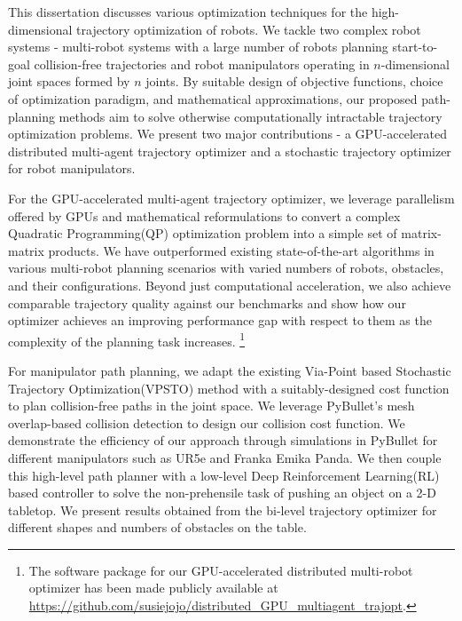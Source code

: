 This dissertation discusses various optimization techniques for the high-dimensional trajectory optimization of robots. We tackle two complex robot systems - multi-robot systems with a large number of robots planning start-to-goal collision-free trajectories and robot manipulators operating in $n$-dimensional joint spaces formed by $n$ joints. By suitable design of objective functions, choice of optimization paradigm, and mathematical approximations, our proposed path-planning methods aim to solve otherwise computationally intractable trajectory optimization problems. We present two major contributions - a GPU-accelerated distributed multi-agent trajectory optimizer and a stochastic trajectory optimizer for robot manipulators. 

For the GPU-accelerated multi-agent trajectory optimizer, we leverage parallelism offered by GPUs and mathematical reformulations to convert a complex Quadratic Programming(QP) optimization problem into a simple set of matrix-matrix products. We have outperformed existing state-of-the-art algorithms in various multi-robot planning scenarios with varied numbers of robots, obstacles, and their configurations. Beyond just computational acceleration, we also achieve comparable trajectory quality against our benchmarks and show how our optimizer achieves an improving performance gap with respect to them as the complexity of the planning task increases. 
\footnote{The software package for our GPU-accelerated distributed multi-robot optimizer has been made publicly available at \url{https://github.com/susiejojo/distributed_GPU_multiagent_trajopt}.}

For manipulator path planning, we adapt the existing Via-Point based Stochastic Trajectory Optimization(VPSTO) method with a suitably-designed cost function to plan collision-free paths in the joint space. We leverage PyBullet's mesh overlap-based collision detection to design our collision cost function. We demonstrate the efficiency of our approach through simulations in PyBullet for different manipulators such as UR5e and Franka Emika Panda. We then couple this high-level path planner with a low-level Deep Reinforcement Learning(RL) based controller to solve the non-prehensile task of pushing an object on a 2-D tabletop. We present results obtained from the bi-level trajectory optimizer for different shapes and numbers of obstacles on the table. 

